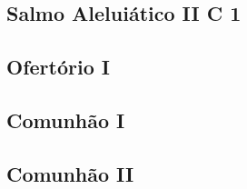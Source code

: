 \AllowPageFlush

\subsection[Salmo Aleluiático II]{Salmo Aleluiático II \textmd{C 1}}\label{subsection:communia/commune-sanctorum/psalmus-alleluiaticus-2}

\AllowPageFlush

\subsection{Ofertório I}\label{subsection:communia/commune-sanctorum/offertorium-1}

\AllowPageFlush

\label{subsection:communia/commune-sanctorum/offertorium-2}

\AllowPageFlush

\subsection{Comunhão I}\label{subsection:communia/commune-sanctorum/communio-1}

\AllowPageFlush

\subsection{Comunhão II}\label{subsection:communia/commune-sanctorum/communio-2}
